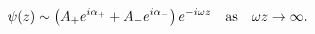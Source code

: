 \begin{equation}
\psi(z) \sim \left( A_+ e^{i \alpha_+} + A_- e^{i \alpha_-} \right) e^{-i 
\omega z} \textrm{\quad as\quad} \omega z \to \infty.
\end{equation}

